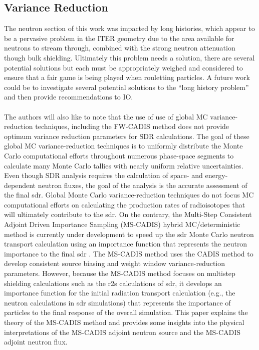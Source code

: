 \documentclass[12pt]{article}
\begin{document}
\subsection*{Variance Reduction}
The neutron section of this work was impacted by long histories, which appear to
be a pervasive problem in the ITER geometry due to the area available for
neutrons to stream through, combined with the strong neutron attenuation though
bulk shielding. Ultimately this problem needs a solution, there are several
potential solutions but each must be appropriately weighed and considered to
ensure that a fair game is being played when rouletting particles. A future
work could be to investigate several potential solutions to the ``long history
problem'' and then provide recommendations to IO.
\\
\\
The authors will also like to note that the use of use of global MC 
variance-reduction techniques, including the FW-CADIS method does not 
provide optimum variance reduction parameters for SDR calculations. 
The goal of these global MC variance-reduction techniques is to uniformly 
distribute the Monte Carlo computational efforts throughout numerous 
phase-space segments to calculate many Monte Carlo tallies with nearly 
uniform relative uncertainties. Even though SDR analysis requires the 
calculation of space- and energy-dependent neutron fluxes, the goal of 
the analysis is the accurate assessment of the final \gls{sdr}. Global 
Monte Carlo variance-reduction techniques do not focus MC computational 
efforts on calculating the production rates of radioisotopes that will 
ultimately contribute to the \gls{sdr}. On the contrary, the Multi-Step 
Consistent Adjoint Driven Importance Sampling (MS-CADIS) hybrid 
MC/deterministic method is currently under development to speed up the \gls{sdr}
 Monte Carlo neutron transport calculation using an importance function that 
represents the neutron importance to the final \gls{sdr} \cite{mscadis}. 
The MS-CADIS method uses the CADIS method to develop consistent source biasing 
and weight window variance-reduction parameters. However, because the MS-CADIS 
method focuses on multistep shielding calculations such as the \gls{r2s} 
calculations of \gls{sdr}, it develops an importance function for the initial 
radiation transport calculation (e.g., the neutron calculations in \gls{sdr} 
simulations) that represents the importance of particles to the final response
 of the overall simulation. This paper explains the theory of the MS-CADIS 
method and provides some insights into the physical interpretations of the 
MS-CADIS adjoint neutron source and the MS-CADIS adjoint neutron flux.
\end{document}
